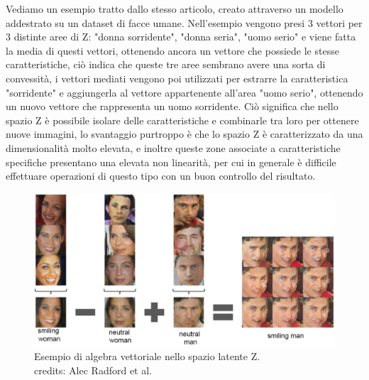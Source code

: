 Vediamo un esempio tratto dallo stesso articolo, creato attraverso un modello addestrato su un dataset di facce umane.
Nell'esempio vengono presi 3 vettori per 3 distinte aree di Z: "donna sorridente", "donna seria", "uomo serio" e viene fatta la media 
di questi vettori, ottenendo ancora un vettore che possiede le stesse caratteristiche, ciò indica che queste tre aree sembrano avere una sorta di 
convessità, i vettori mediati vengono poi utilizzati per estrarre la caratteristica "sorridente" e aggiungerla al vettore appartenente all'area "uomo serio",
ottenendo un nuovo vettore che rappresenta un uomo sorridente.
Ciò significa che nello spazio Z è possibile isolare delle caratteristiche e combinarle tra loro per ottenere nuove immagini, lo svantaggio purtroppo
è che lo spazio Z è caratterizzato da una dimensionalità molto elevata, e inoltre queste zone associate a caratteristiche specifiche presentano una elevata
non linearità, per cui in generale è difficile effettuare operazioni di questo tipo con un buon controllo del risultato.

    \begin{figure}[H]
        \centering
        \includegraphics[width=1.0\textwidth]{imgs/DCGAN_vectorial_algebra.png}
        \caption{Esempio di algebra vettoriale nello spazio latente Z.\\
        credits: Alec Radford et al. \cite{radford2016unsupervised}}
        \label{fig:DCGAN_vectorial_algebra}
    \end{figure}

